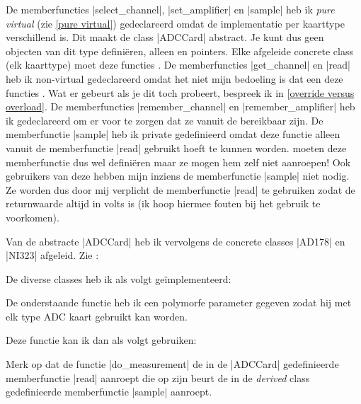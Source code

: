 \begin{cpplstShortInline}


De memberfuncties |select_channel|, |set_amplifier| en |sample| heb ik \emph{pure virtual} (zie \cref{pure virtual}) gedeclareerd omdat de implementatie per kaarttype verschillend is.
Dit maakt de class |ADCCard| abstract.
Je kunt dus geen objecten van dit type definiëren, alleen  en pointers.
Elke afgeleide concrete class (elk kaarttype) moet deze functies .
De memberfuncties |get_channel| en |read| heb ik non-virtual gedeclareerd omdat het niet mijn bedoeling is dat een  deze
functies .
Wat er gebeurt als je dit toch probeert, bespreek ik in \cref{override versus overload}.
De memberfuncties |remember_channel| en |remember_amplifier| heb ik  gedeclareerd om er voor te zorgen dat ze vanuit de  bereikbaar zijn. 
De memberfunctie |sample| heb ik private gedefinieerd omdat deze functie alleen vanuit de memberfunctie |read| gebruikt hoeft te kunnen worden.
 moeten deze memberfunctie dus wel definiëren maar ze mogen hem zelf niet aanroepen!
Ook gebruikers van deze  hebben mijn inziens de memberfunctie |sample| niet nodig.
Ze worden dus door mij verplicht de memberfunctie |read| te gebruiken zodat de returnwaarde altijd in volts is (ik hoop hiermee fouten bij het gebruik te voorkomen).

Van de abstracte  |ADCCard| heb ik vervolgens de concrete classes |AD178| en |NI323| afgeleid. Zie :

De diverse classes heb ik als volgt geïmplementeerd:

De onderstaande functie heb ik een polymorfe parameter gegeven zodat hij met elk type ADC kaart gebruikt kan worden.

Deze functie kan ik dan als volgt gebruiken:

Merk op dat de functie |do_measurement| de in de  |ADCCard| gedefinieerde memberfunctie |read| aanroept die op zijn beurt de in de \emph{derived} class gedefinieerde memberfunctie |sample| aanroept.


\end{cpplstShortInline}
